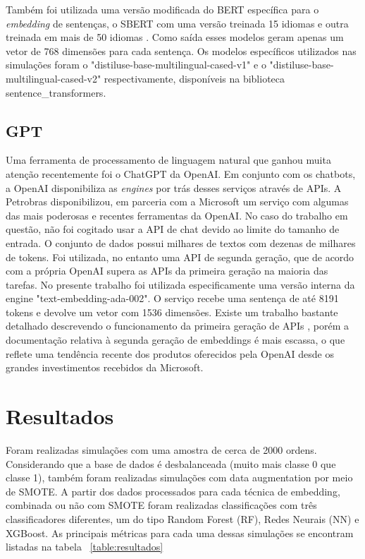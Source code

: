 \documentclass[conference]{IEEEtran}
\begin{document}
  Também foi utilizada uma versão modificada do BERT específica para o \textit{embedding} de sentenças, o SBERT \cite{reimers-2019-sentence-bert} com uma versão treinada 15 idiomas e outra treinada em mais de 50 idiomas \cite{reimers-2020-multilingual-sentence-bert}. Como saída esses modelos geram apenas um vetor de 768 dimensões para cada sentença. Os modelos específicos utilizados nas simulações foram o "distiluse-base-multilingual-cased-v1" e o "distiluse-base-multilingual-cased-v2" respectivamente, disponíveis na biblioteca sentence\_transformers.

\subsection{GPT}

  Uma ferramenta de processamento de linguagem natural que ganhou muita atenção recentemente foi o ChatGPT da OpenAI. Em conjunto com os chatbots, a OpenAI disponibiliza as \textit{engines} por trás desses serviços através de APIs. A Petrobras disponibilizou, em parceria com a Microsoft um serviço com algumas das mais poderosas e recentes ferramentas da OpenAI. No caso do trabalho em questão, não foi cogitado usar a API de chat devido ao limite do tamanho de entrada. O conjunto de dados possui milhares de textos com dezenas de milhares de tokens. Foi utilizada, no entanto uma API de segunda geração, que de acordo com a própria OpenAI supera as APIs da primeira geração na maioria das tarefas. No presente trabalho foi utilizada especificamente uma versão interna da engine "text-embedding-ada-002". O serviço recebe uma sentença de até 8191 tokens e devolve um vetor com 1536 dimensões. Existe um trabalho bastante detalhado descrevendo o funcionamento da primeira geração de APIs \cite{neelakantan2022text}, porém a documentação relativa à segunda geração de embeddings é mais escassa, o que reflete uma tendência recente dos produtos oferecidos pela OpenAI desde os grandes investimentos recebidos da Microsoft. 

\section{Resultados}

Foram realizadas simulações com uma amostra de cerca de 2000 ordens. Considerando que a base de dados é desbalanceada (muito mais classe 0 que classe 1), também foram realizadas simulações com data augmentation por meio de SMOTE. A partir dos dados processados para cada técnica de embedding, combinada ou não com SMOTE foram realizadas classificações com três classificadores diferentes, um do tipo Random Forest (RF), Redes Neurais (NN) e XGBoost. As principais métricas para cada uma dessas simulações se encontram listadas na tabela ~\ref{table:resultados}
\end{document}
